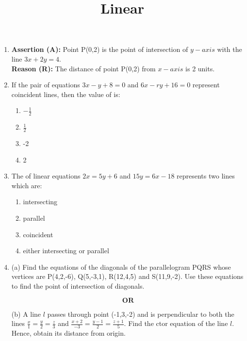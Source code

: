 \documentclass{article}
\title{\textbf{Linear}}
\date{}
\begin{document}
\maketitle

\begin{enumerate}

	\item \textbf{Assertion (A):} Point P(0,2) is the point of intersection of $y-axis$ with  the line $3x+2y=4$.\\
		\textbf{Reason (R):} The distance of point P(0,2) from $x-axis$ is 2 units.

	\item If the pair of equations $3x-y+8=0$ and $6x-ry+16=0$ represent coincident lines, then the value of  is:
		\begin{multicols}{2}
		\begin{enumerate}
			\item $-\frac{1}{2}$
			\item $\frac{1}{2}$
			\item -2
			\item 2
		\end{enumerate}
		\end{multicols}

	\item The of linear equations $2x=5y+6$ and $15y=6x-18$ represents two lines which are:
		\begin{multicols}{2}
			\begin{enumerate}
				\item intersecting
				\item parallel
				\item coincident
				\item either intersecting or parallel
			\end{enumerate}
		\end{multicols}

	\item (a) Find the equations of the diagonals of the parallelogram PQRS whose vertices are P(4,2,-6), Q(5,-3,1), R(12,4,5) and S(11,9,-2). Use these equations to find the point of intersection of diagonals.

		$$\textbf{OR}$$

		(b) A line $l$ passes through point (-1,3,-2) and is perpendicular to both the lines $\frac {x}{1}=\frac{y}{2}=\frac{z}{3}$ and $\frac {x+2}{-3}=\frac{y-1}{2}=\frac{z+1}{5}$. Find the ctor equation of the line $l$. Hence, obtain its distance from origin.

\end{enumerate}
\end{document}
